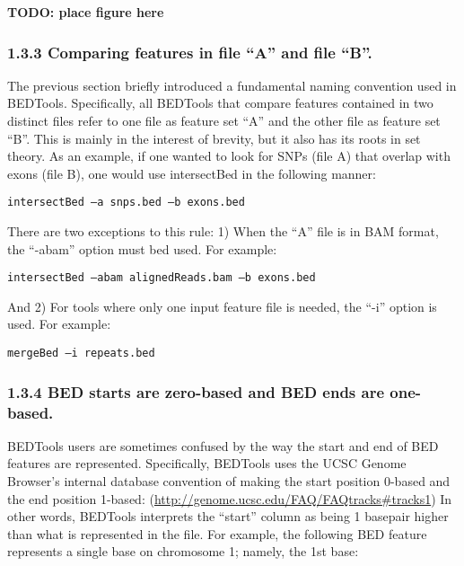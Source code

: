 \documentclass[letterpaper,10pt,english]{sphinxmanual}
\begin{document}
\textbf{TODO: place figure here}


\subsubsection{1.3.3 Comparing features in file “A” and file “B”.}
\label{content/overview:comparing-features-in-file-a-and-file-b}
The previous section briefly introduced a fundamental naming convention used in BEDTools. Specifically, all BEDTools that compare features contained in two distinct files refer to one file as feature set “A” and the other file as feature set “B”. This is mainly in the interest of brevity, but it also has its roots in set theory.
As an example, if one wanted to look for SNPs (file A) that overlap with exons (file B), one would use intersectBed in the following manner:

\begin{Verbatim}[commandchars=\\\{\}]
intersectBed –a snps.bed –b exons.bed
\end{Verbatim}

There are two exceptions to this rule: 1) When the “A” file is in BAM format, the “-abam” option must bed used. For example:

\begin{Verbatim}[commandchars=\\\{\}]
intersectBed –abam alignedReads.bam –b exons.bed
\end{Verbatim}

And 2) For tools where only one input feature file is needed, the “-i” option is used. For example:

\begin{Verbatim}[commandchars=\\\{\}]
mergeBed –i repeats.bed
\end{Verbatim}


\subsubsection{1.3.4 BED starts are zero-based and BED ends are one-based.}
\label{content/overview:bed-starts-are-zero-based-and-bed-ends-are-one-based}
BEDTools users are sometimes confused by the way the start and end of BED features are represented. Specifically, BEDTools uses the UCSC Genome Browser’s internal database convention of making the start position 0-based and the end position 1-based: (\href{http://genome.ucsc.edu/FAQ/FAQtracks\#tracks1}{http://genome.ucsc.edu/FAQ/FAQtracks\#tracks1})
In other words, BEDTools interprets the “start” column as being 1 basepair higher than what is represented in the file. For example, the following BED feature represents a single base on chromosome 1; namely, the 1st base:
\end{document}
